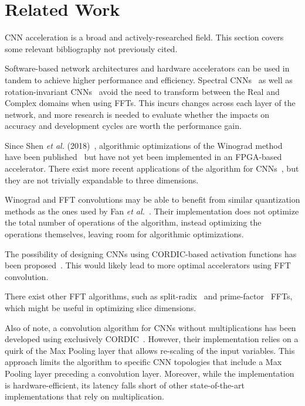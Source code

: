 
\section{Related Work}\label{sec:rela}

CNN acceleration is a broad and actively-researched field. This section covers some relevant bibliography not previously cited.

Software-based network architectures and hardware accelerators can be used in tandem to achieve higher performance and efficiency. Spectral CNNs~\cite{pratt2017fcnn,liu2021accelerating,ayat2019spectral,han2021deep,watanabe2021image} as well as rotation-invariant CNNs~\cite{kim2020cycnn,mo2024ric} avoid the need to transform between the Real and Complex domains when using FFTs. This incurs changes across each layer of the network, and more research is needed to evaluate whether the impacts on accuracy and development cycles are worth the performance gain.

Since Shen \textit{et al.} (2018)~\cite{shen2018towards}, algorithmic optimizations of the Winograd method have been published~\cite{barabasz2019winograd,barabasz2020error,alam2022winograd} but have not yet been implemented in an FPGA-based accelerator. There exist more recent applications of the algorithm for CNNs~\cite{kala2019high,jiang2025fpga}, but they are not trivially expandable to three dimensions.

Winograd and FFT convolutions may be able to benefit from similar quantization methods as the ones used by Fan \textit{et al.}~\cite{fan2021high}. Their implementation does not optimize the total number of operations of the algorithm, instead optimizing the operations themselves, leaving room for algorithmic optimizations.

The possibility of designing CNNs using CORDIC-based activation functions has been proposed~\cite{shen2024efficient, kokane2025retrospective}. This would likely lead to more optimal accelerators using FFT convolution.

There exist other FFT algorithms, such as split-radix~\cite{sorensen2003computing} and prime-factor~\cite{burrus1981place} FFTs, which might be useful in optimizing slice dimensions.

Also of note, a convolution algorithm for CNNs without multiplications has been developed using exclusively CORDIC~\cite{parmar2019resource}. However, their implementation relies on a quirk of the Max Pooling layer that allows re-scaling of the input variables. This approach limits the algorithm to specific CNN topologies that include a Max Pooling layer preceding a convolution layer. Moreover, while the implementation is hardware-efficient, its latency falls short of other state-of-the-art implementations that rely on multiplication.

